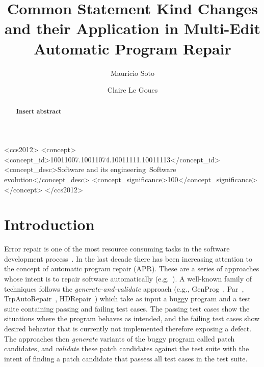 \documentclass[sigconf]{acmart}
\newcommand{\todo}[1]
  {{\scriptsize \textbf{\color{red} {#1}}}}
\begin{document}
\title{Common Statement Kind Changes and their Application in Multi-Edit Automatic Program Repair}


\author{Mauricio Soto}

\author{Claire Le Goues}




\begin{abstract}
\todo{Insert abstract}
\end{abstract}

%
%
\begin{CCSXML}
<ccs2012>
<concept>
<concept_id>10011007.10011074.10011111.10011113</concept_id>
<concept_desc>Software and its engineering~Software evolution</concept_desc>
<concept_significance>100</concept_significance>
</concept>
</ccs2012>
\end{CCSXML}





\maketitle

\section{Introduction}
Error repair is one of the most resource consuming tasks in 
the software development process~\cite{Weiss07,Tassey02,Britton13}.
In the last decade there has been increasing attention to 
the concept of automatic program repair (APR). These are a 
series of approaches whose intent is to repair software
automatically (e.g.~\cite{legoues12,kim2013,Weimer13,long15SPR,long16proph,debroy10,perkins09,wei10}).
A well-known family of techniques follows the \emph{generate-and-validate}
approach (e.g., GenProg~\cite{legoues12}, 
Par~\cite{kim2013}, TrpAutoRepair~\cite{Qi13TrpAutoR}, HDRepair~\cite{xuan16}) 
which take as input a buggy program and a test suite containing
passing and failing test cases.
The passing test cases show the situations where the program  
behaves as intended, and the failing test cases show desired behavior
that is currently not implemented therefore exposing a defect.
The approaches then \emph{generate} variants of the buggy program
called patch candidates, and \emph{validate} these patch
candidates against the test suite with the intent of finding 
a patch candidate that passess all test cases in the test suite.
\end{document}
